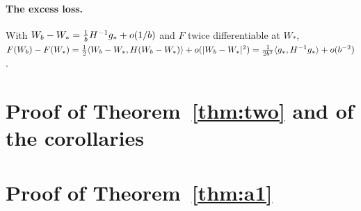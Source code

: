 \documentclass{article}
\theoremstyle{plain}
\theoremstyle{definition}
\theoremstyle{remark}
\begin{document}
\paragraph{The excess loss.} With $W_b-W_\ast=\frac1bH^{-1}g_\ast+o(1/b)$ and $F$ twice differentiable at $W_\ast$,
$F(W_b)-F(W_\ast)=\frac12\langle W_b-W_\ast, H(W_b-W_\ast)\rangle+o(|W_b-W_\ast|^2)=\frac1{2b^2}\langle g_\ast, H^{-1}g_\ast\rangle+o(b^{-2})$.

\section{Proof of Theorem~\ref{thm:two} and of the corollaries}\label{app:two}


\section{Proof of Theorem~\ref{thm:a1}}\label{app:a1}


\end{document}
